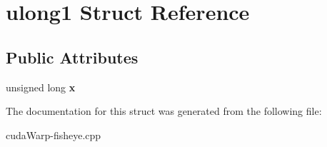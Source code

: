 \hypertarget{structulong1}{}\section{ulong1 Struct Reference}
\label{structulong1}
\subsection*{Public Attributes}
\begin{DoxyCompactItemize}
\item 
unsigned long {\bfseries x}\hypertarget{structulong1_ad0b31fa0538d4d8e67b41a75a97d2d98}{}\label{structulong1_ad0b31fa0538d4d8e67b41a75a97d2d98}

\end{DoxyCompactItemize}


The documentation for this struct was generated from the following file\+:\begin{DoxyCompactItemize}
\item 
cuda\+Warp-\/fisheye.\+cpp\end{DoxyCompactItemize}
